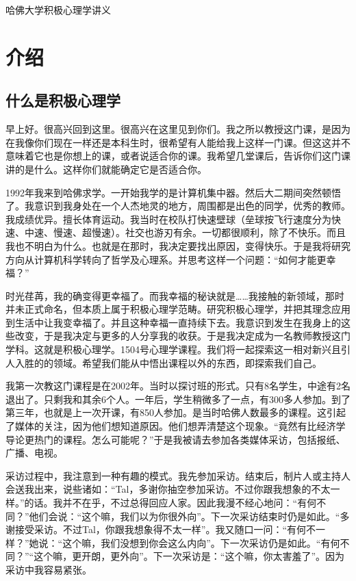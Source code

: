 哈佛大学积极心理学讲义

\section{介绍}
\subsection{什么是积极心理学}
早上好。很高兴回到这里。很高兴在这里见到你们。我之所以教授这门课，是因为在我像你们现在一样还是本科生时，很希望有人能给我上这样一门课。但这这并不意味着它也是你想上的课，或者说适合你的课。我希望几堂课后，告诉你们这门课讲的是什么。这样你们就能确定它是否适合你。

1992年我来到哈佛求学。一开始我学的是计算机集中器。然后大二期间突然顿悟了。我意识到我身处在一个人杰地灵的地方，周围都是出色的同学，优秀的教师。我成绩优异。擅长体育运动。我当时在校队打快速壁球（垒球按飞行速度分为快速、中速、慢速、超慢速）。社交也游刃有余。一切都很顺利，除了不快乐。而且我也不明白为什么。也就是在那时，我决定要找出原因，变得快乐。于是我将研究方向从计算机科学转向了哲学及心理系。并思考这样一个问题：“如何才能更幸福？”

时光荏苒，我的确变得更幸福了。而我幸福的秘诀就是……我接触的新领域，那时并未正式命名，但本质上属于积极心理学范畴。研究积极心理学，并把其理念应用到生活中让我变幸福了。并且这种幸福一直持续下去。我意识到发生在我身上的这些改变，于是我决定与更多的人分享我的收获。于是我决定成为一名教师教授这门学科。这就是积极心理学。1504号心理学课程。我们将一起探索这一相对新兴且引人入胜的的领域。希望我们能从中悟出课程以外的东西，即探索我们自己。

我第一次教这门课程是在2002年。当时以探讨班的形式。只有8名学生，中途有2名退出了。只剩我和其余6个人。一年后，学生稍微多了一点，有300多人参加。到了第三年，也就是上一次开课，有850人参加。是当时哈佛人数最多的课程。这引起了媒体的关注，因为他们想知道原因。他们想弄清楚这个现象。“竟然有比经济学导论更热门的课程。怎么可能呢？”于是我被请去参加各类媒体采访，包括报纸、广播、电视。

采访过程中，我注意到一种有趣的模式。我先参加采访。结束后，制片人或主持人会送我出来，说些诸如：“Tal，多谢你抽空参加采访。不过你跟我想象的不太一样。”的话。我并不在乎，不过总得回应人家。因此我漫不经心地问：“有何不同？”他们会说：“这个嘛，我们以为你很外向”。下一次采访结束时仍是如此。“多谢接受采访。不过Tal，你跟我想象得不太一样”。我又随口一问：“有何不一样？”她说：“这个嘛，我们没想到你会这么内向”。下一次采访仍是如此。“有何不同？”“这个嘛，更开朗，更外向”。下一次采访是：“这个嘛，你太害羞了”。因为采访中我容易紧张。

